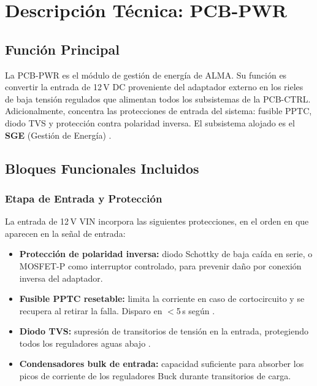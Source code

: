 \chapter{Descripción Técnica: PCB-PWR}
\label{chap:pcb_pwr}

\section{Función Principal}
\label{sec:pwr_funcion}

La PCB-PWR es el módulo de gestión de energía de ALMA. Su función es convertir la
entrada de 12\,V DC proveniente del adaptador externo en los rieles de baja tensión
regulados que alimentan todos los subsistemas de la PCB-CTRL. Adicionalmente,
concentra las protecciones de entrada del sistema: fusible PPTC, diodo TVS y
protección contra polaridad inversa. El subsistema alojado es el \textbf{SGE}
(Gestión de Energía) .

\section{Bloques Funcionales Incluidos}
\label{sec:pwr_bloques}

\subsection{Etapa de Entrada y Protección}

La entrada de 12\,V VIN incorpora las siguientes protecciones, en el orden en que
aparecen en la señal de entrada:

\begin{itemize}
  \item \textbf{Protección de polaridad inversa:} diodo Schottky de baja caída en
    serie, o MOSFET-P como interruptor controlado, para prevenir daño por conexión
    inversa del adaptador.
  \item \textbf{Fusible PPTC resetable:} limita la corriente en caso de
    cortocircuito y se recupera al retirar la falla. Disparo en $<$5\,s según
    .
  \item \textbf{Diodo TVS:} supresión de transitorios de tensión en la entrada,
    protegiendo todos los reguladores aguas abajo .
  \item \textbf{Condensadores bulk de entrada:} capacidad suficiente para absorber
    los picos de corriente de los reguladores Buck durante transitorios de carga.
\end{itemize}

